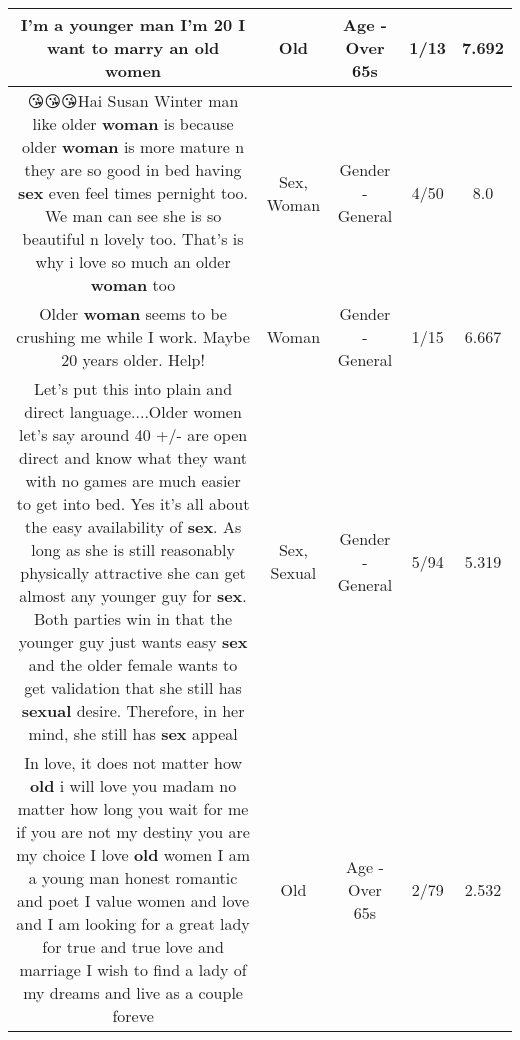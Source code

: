 \documentclass[11pt]{article}
\newlength\mylength
\begin{document}
\begin{center}
\begin{longtable}{|C{.65\mylength}|C{.30\mylength}|C{.12\mylength}|C{.12\mylength}|C{.12\mylength}|}
  \small I'm a younger man I'm 20 I want to marry an \textbf{old} women\normalsize   & Old & Age - Over 65s & 1/13 & 7.692 \\  \hline
  \small 😘😘😘Hai Susan Winter man like older \textbf{woman} is because older \textbf{woman} is more mature n they are so good  in  bed having \textbf{sex} even feel times pernight  too. We man can see she is so beautiful n lovely too. That's is why i love so much an older \textbf{woman} too\normalsize   & Sex, Woman & Gender - General & 4/50 & 8.0 \\  \hline
  \small Older \textbf{woman} seems to be crushing me while I work. Maybe 20 years older. Help!\normalsize   & Woman & Gender - General & 1/15 & 6.667 \\  \hline
  \small Let's put this into plain and direct language....Older women let's say around 40 +/- are open direct and know what they want with no games are much easier to get into bed.  Yes it's all about the easy availability of \textbf{sex}.  As long as she is still reasonably physically attractive she can get almost any younger guy for \textbf{sex}.  Both parties win in that the younger guy just wants easy \textbf{sex} and the older female wants to get validation that she still has \textbf{sexual} desire.  Therefore,  in her mind, she still has \textbf{sex} appeal\normalsize   & Sex, Sexual & Gender - General & 5/94 & 5.319 \\  \hline
  \small In love, it does not matter how \textbf{old} i will love you madam no matter how long you wait for me if you are not my destiny you are my choice I love \textbf{old} women I am a young man honest romantic and poet I value women and love and I am looking for a great lady for true and true love and marriage I wish to find a lady of my dreams and live as a couple foreve\normalsize   & Old & Age - Over 65s & 2/79 & 2.532 \\  \hline

\end{longtable}
\end{center}
\end{document}
